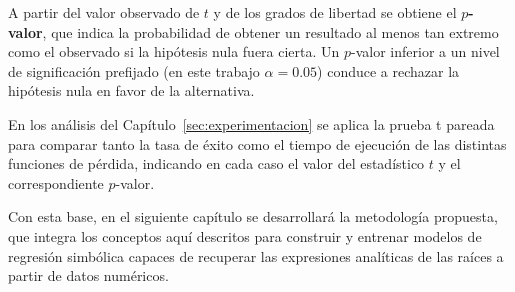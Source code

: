 A partir del valor observado de \(t\) y de los grados de libertad se obtiene el \textbf{\(p\)-valor}, que indica la probabilidad de obtener un resultado al menos tan extremo como el observado si la hipótesis nula fuera cierta. Un \(p\)-valor inferior a un nivel de significación prefijado (en este trabajo \(\alpha = 0.05\)) conduce a rechazar la hipótesis nula en favor de la alternativa.

En los análisis del Capítulo~\ref{sec:experimentacion} se aplica la prueba t pareada para comparar tanto la tasa de éxito como el tiempo de ejecución de las distintas funciones de pérdida, indicando en cada caso el valor del estadístico \(t\) y el correspondiente \(p\)-valor.

\bigskip Con esta base, en el siguiente capítulo se desarrollará la metodología propuesta, que integra los conceptos aquí descritos para construir y entrenar modelos de regresión simbólica capaces de recuperar las expresiones analíticas de las raíces a partir de datos numéricos.
